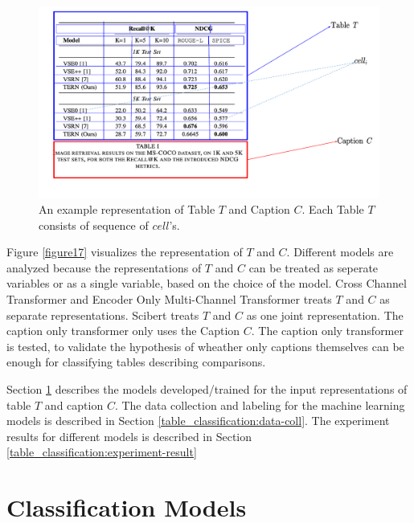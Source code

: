 \begin{figure}[h]
    \centering
    \includegraphics[width=\maxwidth{\textwidth}]{src/images/table-structure.pdf}
    \caption{An example representation of Table $T$ and Caption $C$. Each Table $T$ consists of sequence of $cell$'s. }
    \label{figure\arabic{figurecounter}}
\end{figure}

Figure \ref{figure17} visualizes the representation of $T$ and $C$. Different models are analyzed because the representations of $T$ and $C$ can be treated as seperate variables or as a single variable, based on the choice of the model. Cross Channel Transformer and Encoder Only Multi-Channel Transformer treats $T$ and $C$ as separate representations. Scibert treats $T$ and $C$ as one joint representation. The caption only transformer only uses the Caption $C$. The caption only transformer is tested, to validate the hypothesis of wheather only captions themselves can be enough for classifying tables describing comparisons. 

Section \ref{table_classification:models} describes the models developed/trained for the input representations of table $T$ and caption $C$. The data collection and labeling for the machine learning models is described in Section \ref{table_classification:data-coll}. The experiment results for different models is described in Section \ref{table_classification:experiment-result}

\section{Classification Models}
\label{table_classification:models}

